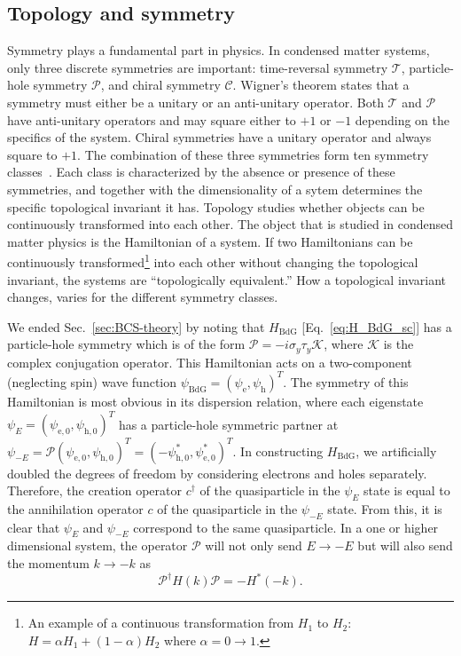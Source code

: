 \subsection{Topology and symmetry}\label{sec:topology_intro}
Symmetry plays a fundamental part in physics.
In condensed matter systems, only three discrete symmetries are important: time-reversal symmetry $\mathcal{T}$, particle-hole symmetry $\mathcal{P}$, and chiral symmetry $\mathcal{C}$.
Wigner's theorem states that a symmetry must either be a unitary or an anti-unitary operator.  %
Both $\mathcal{T}$ and $\mathcal{P}$ have anti-unitary operators and may square either to $+1$ or $-1$ depending on the specifics of the system.
Chiral symmetries have a unitary operator and always square to $+1$.
The combination of these three symmetries form ten symmetry classes~\cite{Altland1997}.
Each class is characterized by the absence or presence of these symmetries, and together with the dimensionality of a sytem determines the specific topological invariant it has.
Topology studies whether objects can be continuously transformed into each other.
The object that is studied in condensed matter physics is the Hamiltonian of a system.
If two Hamiltonians can be continuously transformed\footnote{An example of a continuous transformation from $H_{1}$ to $H_{2}$: $H=\alpha H_{1}+(1-\alpha)H_{2}$ where $\alpha=0\rightarrow1$.} into each other without changing the topological invariant, the systems are ``topologically equivalent.''
How a topological invariant changes, varies for the different symmetry classes.

We ended Sec.~\ref{sec:BCS-theory} by noting that $H_{\textrm{BdG}}$ [Eq.~\eqref{eq:H_BdG_sc}] has a particle-hole symmetry which is of the form $\mathcal{P} = -i \sigma_y \tau_y \mathcal{K}$, where $\mathcal{K}$ is the complex conjugation operator.
This Hamiltonian acts on a two-component (neglecting spin) wave function $\psi_{\textrm{BdG}}=\left(\psi_\textrm{e}, \psi_\textrm{h} \right)^{T}$.
The symmetry of this Hamiltonian is most obvious in its dispersion relation, where each eigenstate $\psi_{E}=\left(\psi_{\textrm{e},0},\psi_{\textrm{h},0}\right)^{T}$ has a particle-hole symmetric partner at $\psi_{-E}=\mathcal{P}\left(\psi_{\textrm{e},0},\psi_{\textrm{h},0}\right)^{T}=\left(-\psi_{\textrm{h},0}^*, \psi_{\textrm{e},0}^*\right)^{T}$.
In constructing $H_{\textrm{BdG}}$, we artificially doubled the degrees of freedom by considering electrons and holes separately.
Therefore, the creation operator $c^{\dagger}$ of the quasiparticle in the $\psi_{E}$ state is equal to the annihilation operator $c$ of the quasiparticle in the $\psi_{-E}$ state.
From this, it is clear that $\psi_{E}$ and $\psi_{-E}$ correspond to the same quasiparticle.
In a one or higher dimensional system, the operator $\mathcal{P}$ will not only send $E \rightarrow -E$ but will also send the momentum $k \rightarrow -k$ as
\begin{equation}
\mathcal{P^{\dagger}}H\left(k\right)\mathcal{P}=-H^*\left(-k\right).
\end{equation}

